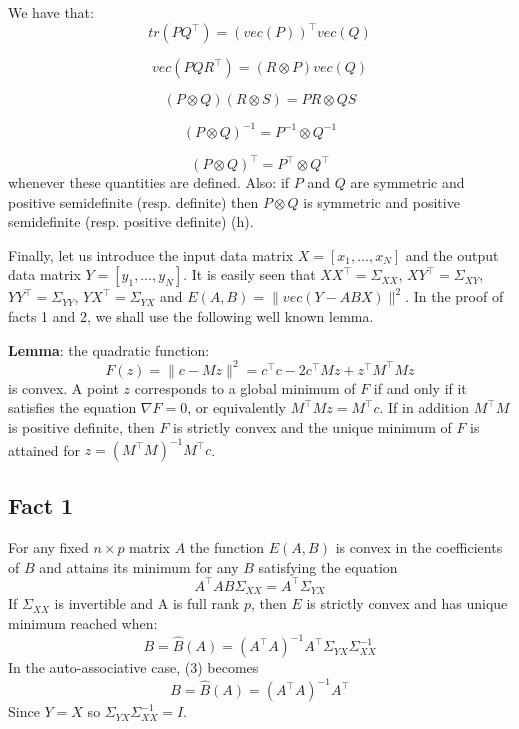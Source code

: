 We have that:
\begin{equation} \tag{c}
    tr(PQ^\intercal) = (vec(P))^\intercal vec(Q)
\end{equation}

\begin{equation} \tag{d}
    vec(PQR^\intercal) = (R \otimes P) vec(Q)
\end{equation}

\begin{equation} \tag{e}
    (P \otimes Q)(R \otimes S) = PR \otimes QS
\end{equation}

\begin{equation} \tag{f}
    (P \otimes Q)^{-1} = P^{-1} \otimes Q^{-1}
\end{equation}

\begin{equation} \tag{g}
    (P \otimes Q)^\intercal = P^\intercal \otimes Q^\intercal
\end{equation}
whenever these quantities are defined. Also: if $P$ and $Q$ are symmetric and positive semidefinite (resp. definite) then $P \otimes Q$ is symmetric and positive semidefinite (resp. positive definite) (h).

Finally, let us introduce the input data matrix $X = [x_1, \dots, x_N]$ and the output data matrix $Y=[y_1, \dots, y_N]$. It is easily seen that $XX^\intercal = \Sigma_{XX}$, $XY^\intercal = \Sigma_{XY}$, $YY^\intercal = \Sigma_{YY}$, $YX^\intercal = \Sigma_{YX}$ and $E(A,B) = \|vec(Y - ABX)\|^2$. In the proof of facts 1 and 2, we shall use the following well known lemma.

\textbf{Lemma}: the quadratic function:
\[F(z) = \|c - Mz\|^2 = c^\intercal c - 2c^\intercal Mz + z^\intercal M^\intercal M z\]
is convex. A point $z$ corresponds to a global minimum of $F$ if and only if it satisfies the equation $\nabla F = 0$, or equivalently $M^\intercal M z = M^\intercal c$. If in addition $M^\intercal M$ is positive definite, then $F$ is strictly convex and the unique minimum of $F$ is attained for $z = (M^\intercal M)^{-1} M^\intercal c$.
    

\subsection{Fact 1}
For any fixed $n \times p$ matrix $A$ the function $E(A,B)$ is convex in the coefficients of $B$ and attains its minimum for any $B$ satisfying the equation
\begin{equation}
    A^\intercal AB\Sigma_{XX} = A^\intercal \Sigma_{YX}
\end{equation}
If $\Sigma_{XX}$ is invertible and A is full rank $p$, then $E$ is strictly convex and has unique minimum reached when:
\begin{equation}\tag{3}
    B = \hat{B}(A) = (A^\intercal A)^{-1} A^\intercal \Sigma_{YX}\Sigma_{XX}^{-1}
\end{equation}
In the auto-associative case, (3) becomes 
\begin{equation}\tag{3'}
    B = \hat{B}(A) = (A^\intercal A)^{-1} A^\intercal 
\end{equation}
Since $Y=X$ so $\Sigma_{YX}\Sigma_{XX}^{-1} = I$.

